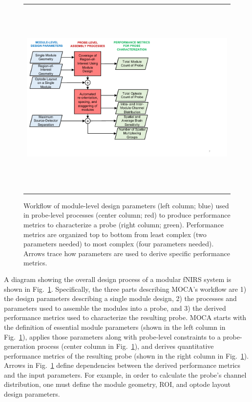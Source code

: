 \begin{figure}
    \begin{center}
    \begin{tabular}{c}
    \includegraphics[height=10cm]{fig/moca/Fig_1.pdf}
    \end{tabular}
    \end{center}
    \caption { \label{fig:flowchart} Workflow of module-level design parameters (left column; blue) used in probe-level processes (center column; red) to produce performance metrics to characterize a probe (right column; green). Performance metrics are organized top to bottom from least complex (two parameters needed) to most complex (four parameters needed). Arrows trace how parameters are used to derive specific performance metrics.} 
\end{figure} 

A diagram showing the overall design process of a modular fNIRS system is shown in Fig.~\ref{fig:flowchart}. Specifically, the three parts describing MOCA's workflow are 1) the design parameters describing a single module design, 2) the processes and parameters used to assemble the modules into a probe, and 3) the derived performance metrics used to characterize the resulting probe. MOCA starts with the definition of essential module parameters (shown in the left column in Fig.~\ref{fig:flowchart}), applies those parameters along with probe-level constraints to a probe-generation process (center column in Fig.~\ref{fig:flowchart}), and derives quantitative performance metrics of the resulting probe (shown in the right column in Fig.~\ref{fig:flowchart}). Arrows in Fig.~\ref{fig:flowchart} define dependencies between the derived performance metrics and the input parameters. For example, in order to calculate the probe's channel distribution, one must define the module geometry, ROI, and optode layout design parameters. 

